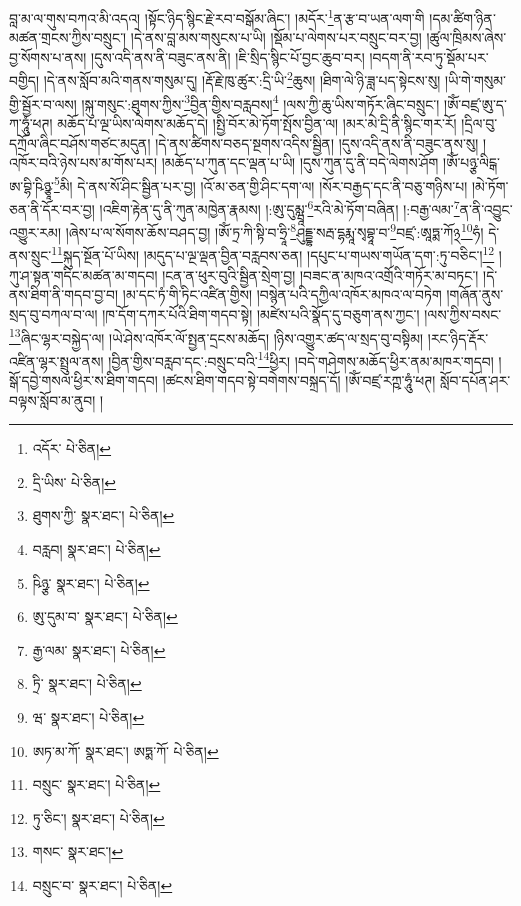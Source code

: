 བླ་མ་ལ་གུས་བཀའ་མི་འདའ། །སྟོང་ཉིད་སྙིང་རྗེ་རབ་བསྒོམ་ཞིང་། །མདོར་\footnote{འདོར་  པེ་ཅིན། }ན་རྩ་བ་ཡན་ལག་གི །དམ་ཚིག་ཉིན་མཚན་གྲངས་ཀྱིས་བསྲུང་། །དེ་ནས་བླ་མས་གསུངས་པ་ཡི། །སྡོམ་པ་ལེགས་པར་བསྲུང་བར་བྱ། །ཚུལ་ཁྲིམས་ཞེས་བྱ་སོགས་པ་ནས། །དུས་འདི་ནས་ནི་བཟུང་ནས་ནི། །ཇི་སྲིད་སྙིང་པོ་བྱང་ཆུབ་བར། །བདག་ནི་རབ་ཏུ་སྡོམ་པར་བགྱིད། །དེ་ནས་སློབ་མའི་གནས་གསུམ་དུ། །རྡོ་རྗེ་ཁུ་ཚུར་:དྲི་ཡི་\footnote{དྲི་ཡིས་  པེ་ཅིན། }ཆུས། །ཐིག་ལེ་ཉི་ཟླ་པད་སྟེངས་སུ། །ཡི་གེ་གསུམ་གྱི་སྦྱོར་བ་ལས། །སྐུ་གསུང་:ཐུགས་ཀྱིས་\footnote{ཐུགས་ཀྱི་  སྣར་ཐང་།  པེ་ཅིན། }བྱིན་གྱིས་བརླབས།\footnote{བརླབ།  སྣར་ཐང་།  པེ་ཅིན། } །ལས་ཀྱི་ཆུ་ཡིས་གཏོར་ཞིང་བསྲུང་། །ཨོཾ་བཛྲ་ཨུ་ད་ཀ་ཧཱུཾ་ཕཊ། མཆོད་པ་ལྔ་ཡིས་ལེགས་མཆོད་དེ། །སྤྱི་བོར་མེ་ཏོག་སྤོས་བྱིན་ལ། །མར་མེ་དྲི་ནི་སྙིང་གར་རོ། །དྲིལ་བུ་དཀྲོལ་ཞིང་བཤོས་གཙང་མདུན། །དེ་ནས་ཚིགས་བཅད་སྔགས་འདིས་སྦྱིན། །དུས་འདི་ནས་ནི་བཟུང་ནས་སུ། །འཁོར་བའི་ཉེས་པས་མ་གོས་པར། །མཆོད་པ་ཀུན་དང་ལྡན་པ་ཡི། །དུས་ཀུན་དུ་ནི་བདེ་ལེགས་ཤོག །ཨོཾ་པཉྩ་ལིངྒ་ཨ་བྷི་ཥིཉྩཱ་\footnote{ཥིཉྩ་  སྣར་ཐང་།  པེ་ཅིན། }མི། དེ་ནས་སོ་ཤིང་སྦྱིན་པར་བྱ། །འོ་མ་ཅན་གྱི་ཤིང་དག་ལ། །སོར་བརྒྱད་དང་ནི་བཅུ་གཉིས་པ། །མེ་ཏོག་ཅན་ནི་དོར་བར་བྱ། །འཇིག་རྟེན་དུ་ནི་ཀུན་མཁྱེན་རྣམས། །:ཨུ་དུམྺཱ་\footnote{ཨུ་དུམ་བ་  སྣར་ཐང་།  པེ་ཅིན། }རའི་མེ་ཏོག་བཞིན། །:བརྒྱ་ལམ་\footnote{རྒྱ་ལམ་  སྣར་ཐང་།  པེ་ཅིན། }ན་ནི་འབྱུང་འགྱུར་རམ། །ཞེས་པ་ལ་སོགས་ཆོས་བཤད་བྱ། །ཨོཾ་ཏྲ་ཀི་སྟི་བ་ཧྲཱི་\footnote{ཏྲི་  སྣར་ཐང་།  པེ་ཅིན། }ཤུདྡྷ་སརྦ་དྷརྨཱ་སྭབྷཱ་བ་\footnote{ཝ་  སྣར་ཐང་།  པེ་ཅིན། }བཛྲ་:ཨཱཏྨ་ཀོ྅\footnote{ཨཏ་མ་ཀོ་  སྣར་ཐང་། ཨཏྨ་ཀོ་  པེ་ཅིན། }ཧཾ། དེ་ནས་སྲུང་\footnote{བསྲུང་  སྣར་ཐང་།  པེ་ཅིན། }སྐུད་སྔོན་པོ་ཡིས། །མདུད་པ་ལྔ་ལྡན་བྱིན་བརླབས་ཅན། །དཔུང་པ་གཡས་གཡོན་དག་:ཏུ་བཅིང་།\footnote{ཏུ་ཅིང་།  སྣར་ཐང་།  པེ་ཅིན། } །ཀུ་ཤ་སྟན་གདིང་མཚན་མ་གདབ། །ངན་ན་ཕུར་བུའི་སྦྱིན་སྲེག་བྱ། །བཟང་ན་མཁའ་འགྲོའི་གཏོར་མ་བཏང་། །དེ་ནས་ཐིག་ནི་གདབ་བྱ་བ། །མ་དང་ཏཾ་གི་ཏིང་འཛིན་གྱིས། །བསྙེན་པའི་དཀྱིལ་འཁོར་མཁའ་ལ་བཏེག །གཞོན་ནུས་སྲད་བུ་བཀལ་བ་ལ། །ཁ་དོག་དཀར་པོའི་ཐིག་གདབ་སྟེ། །མཛེས་པའི་སྣོད་དུ་བཅུག་ནས་ཀྱང་། །ལས་ཀྱིས་བསང་\footnote{གསང་  སྣར་ཐང་། }ཞིང་ལྷར་བསྐྱེད་ལ། །ཡེ་ཤེས་འཁོར་ལོ་སྤྱན་དྲངས་མཆོད། །ཉིས་འགྱུར་ཚད་ལ་སྲད་བུ་བསྟིམ། །རང་ཉིད་རྡོར་འཛིན་ལྷར་སྤྲུལ་ནས། །བྱིན་གྱིས་བརླབ་དང་:བསྲུང་བའི་\footnote{བསྲུང་བ་  སྣར་ཐང་།  པེ་ཅིན། }ཕྱིར། །བདེ་གཤེགས་མཆོད་ཕྱིར་ནམ་མཁར་གདབ། །སྒོ་དབྱེ་གསལ་ཕྱིར་ས་ཐིག་གདབ། །ཚངས་ཐིག་གདབ་སྟེ་བགེགས་བསྐྲད་དོ། །ཨོཾ་བཛྲ་རཀྵ་ཧཱུཾ་ཕཊ། སློབ་དཔོན་ཤར་བལྟས་སློབ་མ་ནུབ། །

